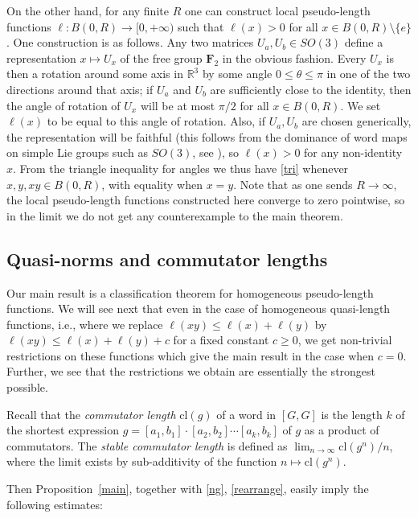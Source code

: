 \documentclass[11pt,a4paper,reqno]{amsart}
\numberwithin{equation}{section}
\theoremstyle{plain}
\theoremstyle{definition}
\newcommand\R{\mathbb{R}}
\newcommand\normsymb{\ell}  %
\newcommand\norm[1]{\ell({#1})}   %
\newcommand\free[1]{\mathbf{F}_{#1}}
\begin{document}
On the other hand, for any finite $R$ one can construct local
pseudo-length functions $\normsymb: B(0,R) \to [0,+\infty)$ such that
$\norm{x} > 0$ for all $x \in B(0,R) \setminus \{e\}$.  One construction
is as follows. Any two matrices $U_a, U_b\in SO(3)$ define a
representation $x \mapsto U_x$ of the free group $\free{2}$ in the
obvious fashion.  Every $U_x$ is then a rotation around some axis in
$\R^3$ by some angle $0 \leq \theta \leq \pi$ in one of the two
directions around that axis; if $U_a$ and $U_b$ are sufficiently close to
the identity, then the angle of rotation of $U_x$ will be at most $\pi/2$
for all $x \in B(0,R)$. We set $\norm{x}$ to be equal to this angle of
rotation.  Also, if $U_a,U_b$ are chosen generically, the representation
will be faithful (this follows from the dominance of word maps on simple
Lie groups such as $SO(3)$, see \cite{borel}), so $\norm{x}>0$ for any
non-identity $x$.  From the triangle inequality for angles we thus have
\eqref{tri} whenever $x,y,xy \in B(0,R)$, with equality when $x=y$.  Note
that as one sends $R \to \infty$, the local pseudo-length functions
constructed here converge to zero pointwise, so in the limit we do not
get any counterexample to the main theorem.


\subsection{Quasi-norms and commutator lengths}

Our main result is  a classification theorem for homogeneous
pseudo-length functions. We will see next that even in the case of
homogeneous quasi-length functions, i.e., where we replace $\norm{xy}
\leq \norm{x} + \norm{y}$ by $\norm{xy} \leq \norm{x} + \norm{y} + c$ for
a fixed constant $c\geq 0$, we get non-trivial restrictions on these
functions which give the main result in the case when $c=0$. Further, we
see that the restrictions we obtain are essentially the strongest
possible.

Recall that the \emph{commutator length} $\mathrm{cl}(g)$ of a word in
$[G, G]$ is the length $k$ of the shortest expression $g = [a_1,
b_1]\cdot[a_2, b_2]\cdots[a_k, b_k]$ of $g$ as a product of commutators.
The \emph{stable commutator length} is defined as $\lim_{n\to\infty}
\mathrm{cl}(g^n)/n$, where the limit exists by sub-additivity of the
function $n\mapsto \mathrm{cl}(g^n)$.

Then Proposition~\ref{main}, together with \eqref{ng}, \eqref{rearrange},
easily imply the following estimates:
\end{document}
